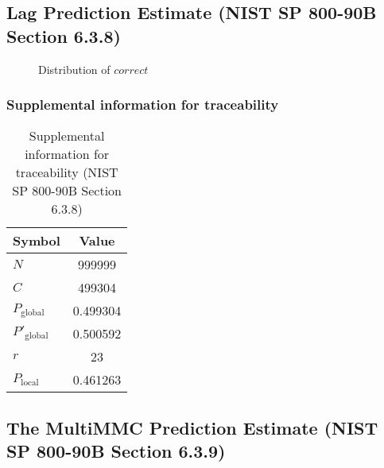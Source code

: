 \documentclass[a3paper,xelatex,english]{bxjsarticle}
\begin{document}
\subsection{Lag Prediction Estimate (NIST SP 800-90B Section 6.3.8)}\label{sec:Binary638}

\begin{figure}[htbp]
\centering

\caption{Distribution of $correct$}
\end{figure}
\subsubsection{Supplemental information for traceability}
\renewcommand{\arraystretch}{1.8}
\begin{table}[h]
\caption{Supplemental information for traceability (NIST SP 800-90B Section 6.3.8)}
\begin{center}
\begin{tabular}{|l|c|}
\hline 
\rowcolor{anotherlightblue} %
Symbol				& Value \\ \hline 
$N$				& 999999\\ \hline 
$C$				& 499304\\ \hline 
$P_{\textrm{global}}$				& 0.499304\\ \hline 
$P'_{\textrm{global}}$			& 0.500592\\ \hline 
$r$				& 23\\ \hline 
$P_{\textrm{local}}$ 			& 0.461263\\ \hline
\end{tabular}
\end{center}
\end{table}
\renewcommand{\arraystretch}{1.4}
\clearpage
\subsection{The MultiMMC Prediction Estimate (NIST SP 800-90B Section 6.3.9)}\label{sec:Binary639}
\end{document}
